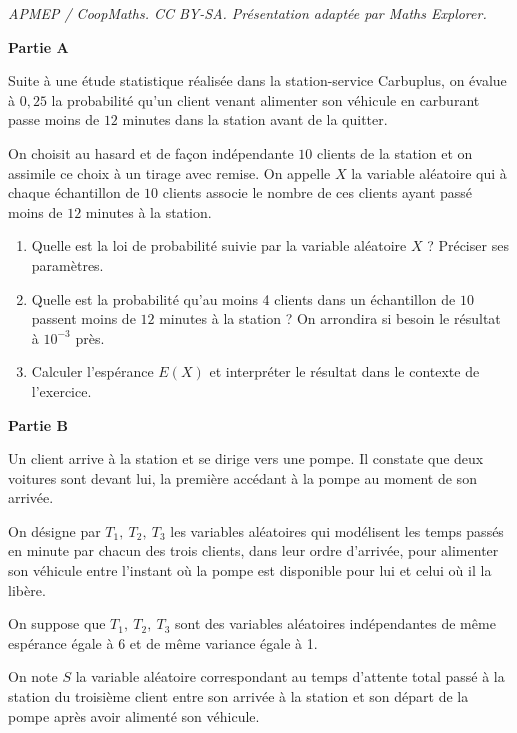 \documentclass[10pt]{article}
\begin{document}
\noindent\textit{APMEP / CoopMaths. CC BY-SA. Présentation adaptée par Maths Explorer.}\par\medskip
\medskip

\begin{center}\textbf{Partie A } \end{center}

Suite à une étude statistique réalisée dans la station-service Carbuplus, on évalue à $0,25$ la probabilité qu'un client venant alimenter son véhicule en carburant passe moins de $12$ minutes dans la station avant de la quitter.

On choisit au hasard et de façon indépendante $10$ clients de la station et on assimile ce choix à un tirage avec remise. On appelle $X$ la variable aléatoire qui à chaque échantillon de $10$ clients associe le nombre de ces clients ayant passé moins de $12$ minutes à la station.

\medskip

\begin{enumerate}
\item Quelle est la loi de probabilité suivie par la variable aléatoire $X$ ? Préciser ses paramètres.
\item Quelle est la probabilité qu'au moins 4 clients dans un échantillon de $10$ passent moins
de $12$ minutes à la station ? On arrondira si besoin le résultat à $10^{-3}$ près.
\item Calculer l'espérance $E(X)$ et interpréter le résultat dans le contexte de l'exercice.
\end{enumerate}

\begin{center}\textbf{Partie B } \end{center}

Un client arrive à la station et se dirige vers une pompe. Il constate que deux voitures sont
devant lui, la première accédant à la pompe au moment de son arrivée.

On désigne par $T_1,\: T_2,\: T_3$ les variables aléatoires qui modélisent les temps passés en minute par chacun des trois clients, dans leur ordre d'arrivée, pour alimenter son véhicule entre l'instant où la pompe est disponible pour lui et celui où il la libère.

On suppose que $T_1,\: T_2,\: T_3$ sont des variables aléatoires indépendantes de même espérance égale à $6$ et de même variance égale à 1.

On note $S$ la variable aléatoire correspondant au temps d'attente total passé à la station du troisième client entre son arrivée à la station et son départ de la pompe après avoir alimenté son véhicule.
\end{document}
